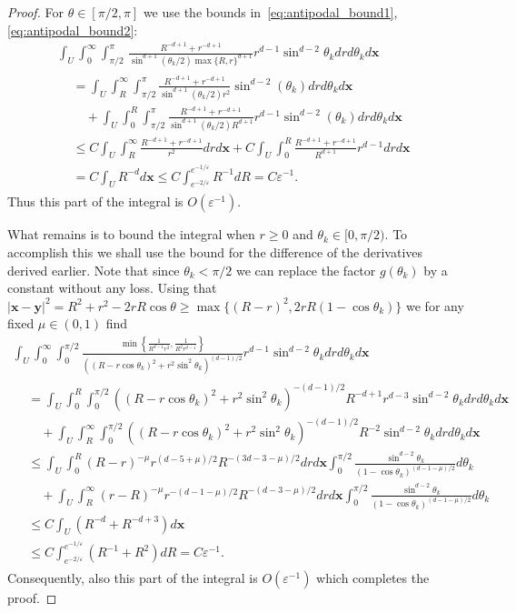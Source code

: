 \documentclass[AHL, Unicode, longabstracts, published]{cedram}
\newcommand*\eps{\varepsilon}
\newcommand\1{{\ensuremath {\mathds 1} }}
\newcommand{\bx}{\mathbf{x}}
\newcommand{\by}{\mathbf{y}}
\begin{document}
\begin{proof}
For $\theta \in [\pi/2, \pi]$ we use the bounds in~\eqref{eq:antipodal_bound1}, \eqref{eq:antipodal_bound2}:
\begin{multline*}
\int_U\!\!\int_0^{\infty}\!\!\int_{\pi/2}^\pi\,
\frac{ R^{-d+1}+r^{-d+1}} {\sin^{d+1}(\theta_k/2) \max\{R, r\}^{d+1}} r^{d-1}\sin^{d-2}\theta_k dr d\theta_k d\bx\\
\begin{aligned}
&=
\int_U\int_R^{\infty}\int_{\pi/2}^\pi
\frac{ R^{-d+1}+r^{-d+1}} {\sin^{d+1}(\theta_k/2) r^{2}}\sin^{d-2}(\theta_k) dr d\theta_k d\bx\\
&\quad+
\int_U\int_0^{R}\int_{\pi/2}^\pi
\frac{ R^{-d+1}+r^{-d+1}} {\sin^{d+1}(\theta_k/2) R^{d+1}} r^{d-1}\sin^{d-2}(\theta_k)dr d\theta_k d\bx\\
&\leq C\int_U\int_R^{\infty}
\frac{ R^{-d+1}+r^{-d+1}} {r^{2}} dr d\bx + C\int_U\int_0^{R}
\frac{ R^{-d+1}+r^{-d+1}} {R^{d+1}} r^{d-1}dr d\bx\\
&= C \int_U R^{-d}d\bx
\leq C \int_{e^{-2/\eps}}^{e^{-1/\eps}}R^{-1}dR = C\eps^{-1}.
\end{aligned}
\end{multline*}
Thus this part of the integral is $O(\eps^{-1})$.


What remains is to bound the integral when $r\geq 0$ and $\theta_k\in [0, \pi/2).$ To accomplish this we shall use the bound for the difference of the derivatives derived earlier. Note that since $\theta_k<\pi/2$ we can replace the factor $g(\theta_k)$ by a constant without any loss. Using that $|\bx-\by|^2=R^2+r^2-2r R\cos\theta\geq \max\{(R-r)^2, 2r R(1-\cos\theta_k)\}$ we for any fixed $\mu\in (0, 1)$ find
\begin{multline*}
\int_U\int_{0}^{\infty}\int_0^{\pi/2}
\frac{
\min\left\{
\frac{1}{R^{d-1}r^{2}},
\frac{1}{R^{2}r^{d-1}}
\right\}} {((R-r \cos\theta_k)^2+r^2\sin^2 \theta_k)^{(d-1)/2}} r^{d-1}\sin^{d-2}\theta_k dr d\theta_k d\bx\\
\begin{aligned}
&=
\int_U\!\!\int_{0}^{R}\!\!\int_0^{\pi/2}\!\!\left((R-r \cos\theta_k)^2+r^2\sin^2 \theta_k\right)^{-(d-1)/2} R^{-d+1}r^{d-3}\sin^{d-2}\theta_k dr d\theta_k d\bx\\
&\quad+
\int_U\int_{R}^{\infty}\int_0^{\pi/2} \left((R-r \cos\theta_k)^2+r^2\sin^2 \theta_k\right)^{-(d-1)/2}R^{-2}\sin^{d-2}\theta_k dr d\theta_k d\bx\\
&\leq
\int_U\int_{0}^{R} (R-r)^{-\mu}r^{(d-5+\mu)/2} R^{-(3d-3-\mu)/2} dr d\bx
\int_0^{\pi/2}\frac{\sin^{d-2}\theta_k}{(1-\cos\theta_k)^{(d-1-\mu)/2}}d\theta_k\\
&\quad+
\int_U\int_{R}^{\infty} (r-R)^{-\mu}r^{-(d-1-\mu)/2} R^{-(d-3-\mu)/2} dr d\bx
\int_0^{\pi/2}\frac{\sin^{d-2}\theta_k}{(1-\cos\theta_k)^{(d-1-\mu)/2}}d\theta_k\\
&\leq C\int_U \left(R^{-d}+R^{-d+3}\right) d\bx\\
&\leq C\int_{e^{-2/\eps}}^{e^{-1/\eps}} \left(R^{-1}+R^2\right) dR = C \eps^{-1}.
\end{aligned}
\end{multline*}
Consequently, also this part of the integral is $O(\eps^{-1})$ which completes the proof.
\end{proof}
\end{document}
